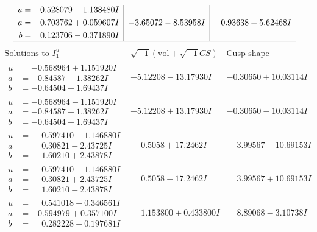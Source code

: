 \documentclass[1p]{elsarticle_modified}
\theoremstyle{definition}
\newcommand{\I}{\sqrt{-1}}
\begin{document}
$$\begin{array}{c|c|c}
\begin{aligned}
u &= \phantom{-}0.528079 - 1.138480 I \\
a &= \phantom{-}0.703762 + 0.059607 I \\
b &= \phantom{-}0.123706 - 0.371890 I\end{aligned}
 & -3.65072 - 8.53958 I & \phantom{-}0.93638 + 5.62468 I\\
 \hline 
 \end{array}$$\newpage$$\begin{array}{c|c|c}  
\text{Solutions to }I^u_{1}& \I (\text{vol} + \sqrt{-1}CS) & \text{Cusp shape}\\
 \hline 
\begin{aligned}
u &= -0.568964 + 1.151920 I \\
a &= -0.84587 - 1.38262 I \\
b &= -0.64504 + 1.69437 I\end{aligned}
 & -5.12208 - 13.17930 I & -0.30650 + 10.03114 I \\ \hline\begin{aligned}
u &= -0.568964 - 1.151920 I \\
a &= -0.84587 + 1.38262 I \\
b &= -0.64504 - 1.69437 I\end{aligned}
 & -5.12208 + 13.17930 I & -0.30650 - 10.03114 I \\ \hline\begin{aligned}
u &= \phantom{-}0.597410 + 1.146880 I \\
a &= \phantom{-}0.30821 - 2.43725 I \\
b &= \phantom{-}1.60210 + 2.43878 I\end{aligned}
 & \phantom{-}0.5058 + 17.2462 I & \phantom{-}3.99567 - 10.69153 I \\ \hline\begin{aligned}
u &= \phantom{-}0.597410 - 1.146880 I \\
a &= \phantom{-}0.30821 + 2.43725 I \\
b &= \phantom{-}1.60210 - 2.43878 I\end{aligned}
 & \phantom{-}0.5058 - 17.2462 I & \phantom{-}3.99567 + 10.69153 I \\ \hline\begin{aligned}
u &= \phantom{-}0.541018 + 0.346561 I \\
a &= -0.594979 + 0.357100 I \\
b &= \phantom{-}0.282228 + 0.197681 I\end{aligned}
 & \phantom{-}1.153800 + 0.433800 I & \phantom{-}8.89068 - 3.10738 I \\ \hline\begin{aligned}

\end{aligned}
\end{array}$$
\end{document}

